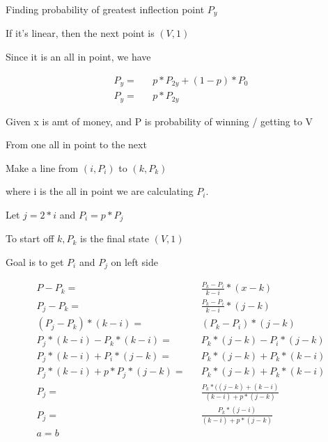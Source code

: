 \documentclass[fleqn]{article}
\begin{document}
Finding probability of greatest inflection point $P_y$

If it's linear, then the next point is $(V, 1)$

Since it is an all in point, we have


\begin{equation}
\begin{alignedat}{2}
  P_y  = && p * P_{2y} + (1-p) * P_{0}  \\
   P_y  = && p * P_{2y} 
 \end{alignedat}
\end{equation}


Given x is amt of money, and P is probability of winning / getting to V

From one all in point to the next

Make a line from $ (i, P_i) $  to $ (k, P_k) $

where i is the all in point we are calculating $P_i$.

Let $ j = 2 * i $ and $ P_i = p * P_j $

To start off $k, P_k$ is the final state $(V, 1)$

Goal is to get $P_i$ and $P_j$ on left side


\begin{equation}
\begin{alignedat}{2}
  P - P_k  = && \frac{P_k-P_i}{k-i} * (x - k)   \\
  P_j - P_k  = && \frac{P_k-P_i}{k-i} * (j - k)   \\
  (P_j - P_k) * (k-i) =  && (P_k-P_i) * (j - k) \\
  P_j * (k-i) - P_k * (k-i)  = && P_k * (j-k) - P_i * (j -k ) \\
  P_j * (k-i)  + P_i * (j -k ) = && P_k * (j-k)  + P_k * (k-i)\\
  P_j * (k-i)  + p*P_j * (j -k ) = && P_k * (j-k)  + P_k * (k-i)\\
  P_j  = && \frac{P_k * ( (j-k)  + (k-i)} {(k-i)+p*(j-k)}\\
  P_j  = && \frac{P_k * ( j-i)} {(k-i)+p*(j-k)}\\
  a = b
 \end{alignedat}
\end{equation}
\end{document}

